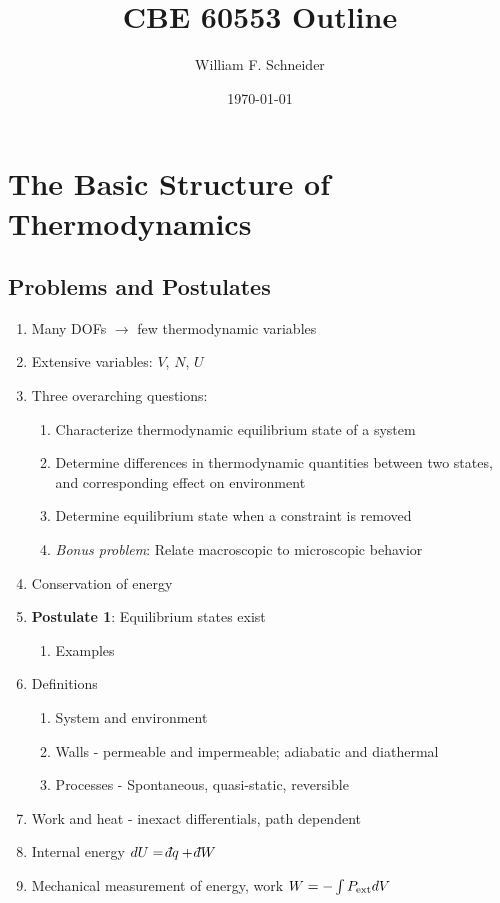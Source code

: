 \documentclass[11pt]{article}
\author{William F. Schneider}
\date{\today}
\title{CBE 60553 Outline}
\def\dbar{{\mathchar'26\mkern-12mu d}}
\begin{document}
\begin{OPTIONS}
\end{OPTIONS}
\section{The Basic Structure of Thermodynamics}
\label{sec:orgebbdda2}
\subsection{Problems and Postulates}
\label{sec:org0715c71}
\begin{enumerate}
\item Many DOFs \(\rightarrow\) few thermodynamic variables
\item Extensive variables: \(V\), \(N\), \(U\)
\item Three overarching questions:
\begin{enumerate}
\item Characterize thermodynamic equilibrium state of a system
\item Determine differences in thermodynamic quantities between two
states, and corresponding effect on environment
\item Determine equilibrium state when a constraint is removed
\item \emph{Bonus problem}: Relate macroscopic to microscopic behavior
\end{enumerate}

\item Conservation of energy
\item \textbf{Postulate 1}: Equilibrium states exist
\begin{enumerate}
\item Examples
\end{enumerate}

\item Definitions
\begin{enumerate}
\item System and environment
\item Walls - permeable and impermeable; adiabatic and diathermal
\item Processes - Spontaneous, quasi-static, reversible
\end{enumerate}

\item Work and heat - inexact differentials, path dependent
\item Internal energy \(dU = \dbar q + \dbar W\)
\item Mechanical measurement of energy, work \(W = - \int P_{\rm ext} dV\)


\end{enumerate}
\end{document}
